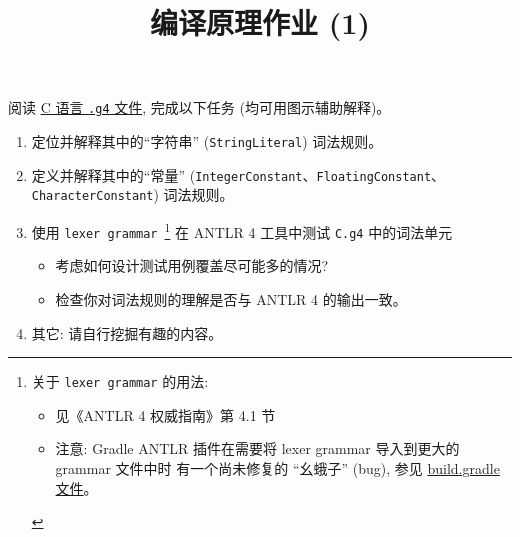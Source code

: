\documentclass[a4paper, justified]{tufte-handout}
\title{编译原理作业 (1)}
\date{\zhtoday}
\begin{document}
\maketitle
\noplagiarism %
\begin{abstract}
\end{abstract}
\beginrequired
\begin{problem}
  阅读 \href{https://github.com/antlr/grammars-v4/blob/master/c/C.g4}{C 语言 \texttt{.g4}
  文件}, 完成以下任务 (均可用图示辅助解释)。
  \begin{enumerate}[(1)]
    \item 定位并解释其中的``字符串'' (\texttt{StringLiteral}) 词法规则。
    \item 定义并解释其中的``常量'' (\texttt{IntegerConstant}、\texttt{FloatingConstant}、\texttt{CharacterConstant}) 词法规则。
    \item 使用 \texttt{lexer grammar}~\footnote{
      关于 \texttt{lexer grammar} 的用法:
      \begin{itemize}
        \item 见《ANTLR 4 权威指南》第 4.1 节
        \item 注意: Gradle ANTLR 插件在需要将 lexer grammar 导入到更大的 grammar 文件中时
          有一个尚未修复的 ``幺蛾子'' (bug), 参见 \href{https://github.com/courses-at-nju-by-hfwei/2024-compilers-coding-0/blob/5bac437778703698372b4913d0d5197e7890bc02/build.gradle\#L34}{build.gradle 文件}。
      \end{itemize}} 在 ANTLR 4 工具中测试 \texttt{C.g4} 中的词法单元
      \begin{itemize}
        \item 考虑如何设计测试用例覆盖尽可能多的情况?
        \item 检查你对词法规则的理解是否与 ANTLR 4 的输出一致。
      \end{itemize}
    \item 其它: 请自行挖掘有趣的内容。
  \end{enumerate}
\end{problem}
\end{document}
